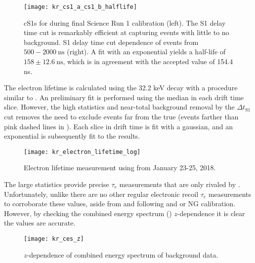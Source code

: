 \begin{figure}
\centering
\texttt{[image: kr\_cs1\_a\_cs1\_b\_halflife]}
\caption{cS1s for \metakr during final Science Run 1 calibration (left).  The S1 delay time cut is remarkably efficient at capturing
\metakr events with little to no background.  S1 delay time cut dependence of events from $500-2000\ \mathrm{ns}$ (right).  A fit with
an exponential yields a half-life of $158 \pm 12.6\ \mathrm{ns}$, which is in agreement with the accepted value of 154.4 ns.}
\label{fig:electron_lifetimes_measurement_kr_cs1_halflife}
\end{figure}

The electron lifetime is calculated using the 32.2 keV decay with a procedure similar to \alphadecays
{}.  An preliminary fit is performed using the median \stwob in each drift time
slice.  However, the high statistics and near-total background removal by the $\Delta t_{\mathrm{S1}}$ cut
removes the need to exclude events far from the true \metakr (events farther than pink dashed lines in
).  Each slice in drift time is fit with a gaussian, and an exponential
is subsequently fit to the results.

\begin{figure}
\centering
\texttt{[image: kr\_electron\_lifetime\_log]}
\caption{Electron lifetime measurement using \metakr from January 23-25, 2018.}
\label{fig:electron_lifetimes_measurement_kr_elifetime}
\end{figure}

The large statistics provide precise $\tau_e$ measurements that are only rivaled by .  Unfortunately, unlike
\alphadecays there are no other regular electronic recoil $\tau_e$ measurements to corroborate these values, aside from
 and  following and \ambe or NG calibration.  However, by checking the combined energy spectrum
() $z$-dependence it is clear the values are accurate.

\begin{figure}
\centering
\texttt{[image: kr\_ces\_z]}
\caption{$z$-dependence of combined energy spectrum of background data.}
\label{fig:electron_lifetimes_measurement_kr_ces_z}
\end{figure}



